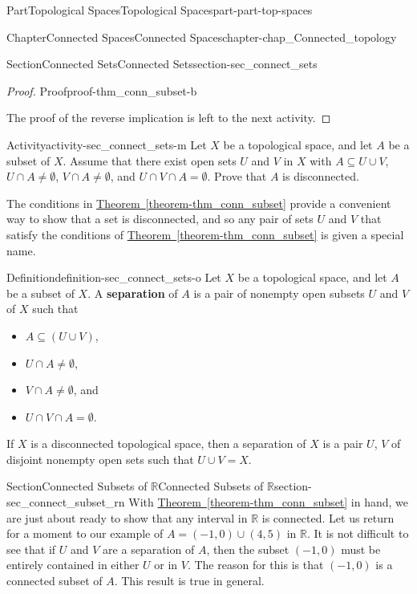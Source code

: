 \documentclass[oneside,10pt,]{book}
\newcommand{\xreffont}{\relax}
\newcommand{\terminology}[1]{\textbf{#1}}
\numberwithin{equation}{chapter}
\newcommand{\R}{\mathbb{R}}
\begin{document}
\begin{partptx}{Part}{Topological Spaces}{}{Topological Spaces}{}{}{part-part-top-spaces}
\begin{chapterptx}{Chapter}{Connected Spaces}{}{Connected Spaces}{}{}{chapter-chap_Connected_topology}
\begin{sectionptx}{Section}{Connected Sets}{}{Connected Sets}{}{}{section-sec_connect_sets}
\begin{proof}{Proof}{}{proof-thm_conn_subset-b}
\par
The proof of the reverse implication is left to the next activity.%
\end{proof}
\begin{activity}{Activity}{}{activity-sec_connect_sets-m}%
Let \(X\) be a topological space, and let \(A\) be a subset of \(X\). Assume that there exist open sets \(U\) and \(V\) in \(X\) with \(A \subseteq U \cup V\), \(U \cap A \neq \emptyset\), \(V \cap A \neq \emptyset\), and \(U \cap V \cap A = \emptyset\). Prove that \(A\) is disconnected.%
\end{activity}%
The conditions in \hyperref[theorem-thm_conn_subset]{Theorem~{\xreffont\ref{theorem-thm_conn_subset}}} provide a convenient way to show that a set is disconnected, and so any pair of sets \(U\) and \(V\) that satisfy the conditions of \hyperref[theorem-thm_conn_subset]{Theorem~{\xreffont\ref{theorem-thm_conn_subset}}} is given a special name.%
\begin{definition}{Definition}{}{definition-sec_connect_sets-o}%
%
Let \(X\) be a topological space, and let \(A\) be a subset of \(X\). A \terminology{separation} of \(A\) is a pair of nonempty open subsets \(U\) and \(V\) of \(X\) such that%
\begin{itemize}[label=\textbullet]
\item{}\(A \subseteq (U \cup V)\),%
\item{}\(U \cap A \neq \emptyset\),%
\item{}\(V \cap A \neq \emptyset\), and%
\item{}\(U \cap V \cap A = \emptyset\).%
\end{itemize}
%
\end{definition}
If \(X\) is a disconnected topological space, then a separation of \(X\) is a pair \(U\), \(V\) of disjoint nonempty open sets such that \(U \cup V = X\).%
\end{sectionptx}
%
%
\typeout{************************************************}
\typeout{Section  Connected Subsets of \(\R\)}
\typeout{************************************************}
%
\begin{sectionptx}{Section}{Connected Subsets of \(\R\)}{}{Connected Subsets of \(\R\)}{}{}{section-sec_connect_subset_rn}
With \hyperref[theorem-thm_conn_subset]{Theorem~{\xreffont\ref{theorem-thm_conn_subset}}} in hand, we are just about ready to show that any interval in \(\R\) is connected. Let us return for a moment to our example of \(A = (-1,0) \cup (4,5)\) in \(\R\). It is not difficult to see that if \(U\) and \(V\) are a separation of \(A\), then the subset \((-1,0)\) must be entirely contained in either \(U\) or in \(V\). The reason for this is that \((-1,0)\) is a connected subset of \(A\). This result is true in general.%

\end{sectionptx}
\end{chapterptx}
\end{partptx}
\end{document}
